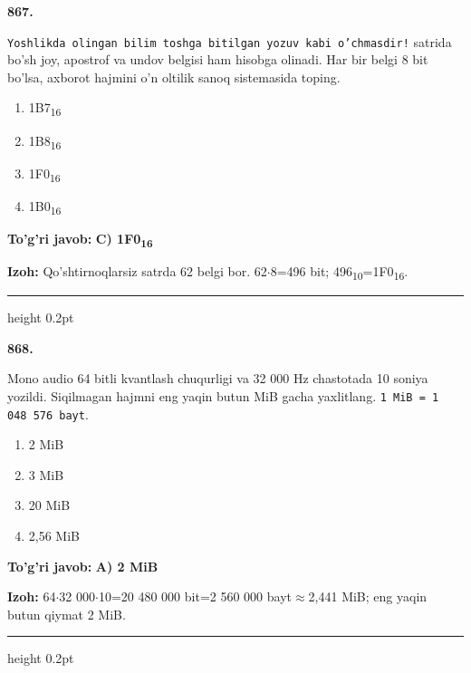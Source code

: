 \documentclass[10pt,a4paper,oneside]{article}
\begin{document}
\noindent\textbf{\color{ink}867.}
\par
\texttt{Yoshlikda olingan bilim toshga bitilgan yozuv kabi o'chmasdir!} satrida bo'sh joy, apostrof va undov belgisi ham hisobga olinadi. Har bir belgi 8 bit bo'lsa, axborot hajmini o'n oltilik sanoq sistemasida toping.
\begin{enumerate}[label=\Alph*),leftmargin=9mm]
\item 1B7\textsubscript{1}\textsubscript{6}
\item 1B8\textsubscript{1}\textsubscript{6}
\item 1F0\textsubscript{1}\textsubscript{6}
\item 1B0\textsubscript{1}\textsubscript{6}
\end{enumerate}
\begin{tcolorbox}[enhanced,breakable,colback=teal!4,colframe=teal!50!black,boxrule=0.5pt,arc=1.1mm,left=3mm,right=3mm,top=1.7mm,bottom=1.7mm,before skip=2mm,after skip=2mm]
\textbf{\color{teal}To'g'ri javob:} \textbf{C) 1F0\textsubscript{1}\textsubscript{6}}
\par\smallskip
\textbf{Izoh:} Qo'shtirnoqlarsiz satrda 62 belgi bor. 62\ensuremath{\cdot}8=496 bit; 496\textsubscript{1}\textsubscript{0}=1F0\textsubscript{1}\textsubscript{6}.
\end{tcolorbox}
\vspace{2mm}\hrule height 0.2pt \vspace{3mm}

\noindent\textbf{\color{ink}868.}
\par
Mono audio 64 bitli kvantlash chuqurligi va 32 000 Hz chastotada 10 soniya yozildi. Siqilmagan hajmni eng yaqin butun MiB gacha yaxlitlang. \texttt{1 MiB = 1 048 576 bayt}.
\begin{enumerate}[label=\Alph*),leftmargin=9mm]
\item 2 MiB
\item 3 MiB
\item 20 MiB
\item 2,56 MiB
\end{enumerate}
\begin{tcolorbox}[enhanced,breakable,colback=teal!4,colframe=teal!50!black,boxrule=0.5pt,arc=1.1mm,left=3mm,right=3mm,top=1.7mm,bottom=1.7mm,before skip=2mm,after skip=2mm]
\textbf{\color{teal}To'g'ri javob:} \textbf{A) 2 MiB}
\par\smallskip
\textbf{Izoh:} 64\ensuremath{\cdot}32 000\ensuremath{\cdot}10=20 480 000 bit=2 560 000 bayt\ensuremath{\approx}2,441 MiB; eng yaqin butun qiymat 2 MiB.
\end{tcolorbox}
\vspace{2mm}\hrule height 0.2pt \vspace{3mm}
\end{document}
